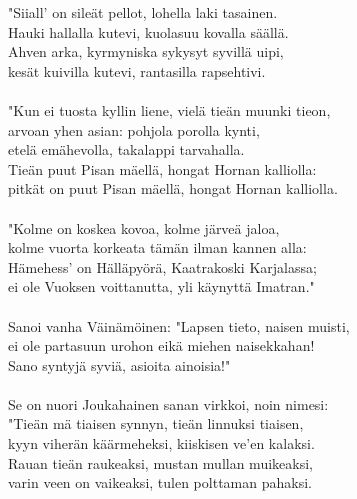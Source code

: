 "Siiall' on sileät pellot, lohella laki tasainen.             \\
Hauki hallalla kutevi, kuolasuu kovalla säällä.               \\
Ahven arka, kyrmyniska sykysyt syvillä uipi,                  \\
kesät kuivilla kutevi, rantasilla rapsehtivi.                 \\
                                                              \\
"Kun ei tuosta kyllin liene, vielä tieän muunki tieon,        \\
arvoan yhen asian: pohjola porolla kynti,                     \\
etelä emähevolla, takalappi tarvahalla.                       \\
Tieän puut Pisan mäellä, hongat Hornan kalliolla:             \\
pitkät on puut Pisan mäellä, hongat Hornan kalliolla.         \\
                                                              \\
"Kolme on koskea kovoa, kolme järveä jaloa,                   \\
kolme vuorta korkeata tämän ilman kannen alla:                \\
Hämehess' on Hälläpyörä, Kaatrakoski Karjalassa;              \\
ei ole Vuoksen voittanutta, yli käynyttä Imatran."            \\
                                                              \\
Sanoi vanha Väinämöinen: "Lapsen tieto, naisen muisti,        \\
ei ole partasuun urohon eikä miehen naisekkahan!              \\
Sano syntyjä syviä, asioita ainoisia!"                        \\
                                                              \\
Se on nuori Joukahainen sanan virkkoi, noin nimesi:           \\
"Tieän mä tiaisen synnyn, tieän linnuksi tiaisen,             \\
kyyn viherän käärmeheksi, kiiskisen ve'en kalaksi.            \\
Rauan tieän raukeaksi, mustan mullan muikeaksi,               \\
varin veen on vaikeaksi, tulen polttaman pahaksi.             \\
